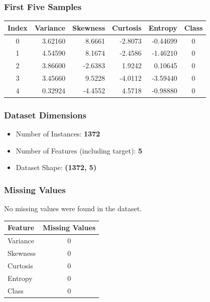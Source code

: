 \documentclass[11pt]{article}
\begin{document}
\subsubsection*{First Five Samples}

\begin{center}
\small
\begin{tabular}{|c|r|r|r|r|c|}
\hline
\textbf{Index} & \textbf{Variance} & \textbf{Skewness} & \textbf{Curtosis} & \textbf{Entropy} & \textbf{Class}\\
\hline
0 & 3.62160 & 8.6661 & -2.8073 & -0.44699 & 0\\
1 & 4.54590 & 8.1674 & -2.4586 & -1.46210 & 0\\
2 & 3.86600 & -2.6383 & 1.9242 & 0.10645 & 0\\
3 & 3.45660 & 9.5228 & -4.0112 & -3.59440 & 0\\
4 & 0.32924 & -4.4552 & 4.5718 & -0.98880 & 0\\
\hline
\end{tabular}
\end{center}

\subsubsection*{Dataset Dimensions}

\begin{itemize}
    \item Number of Instances: \textbf{1372}
    \item Number of Features (including target): \textbf{5}
    \item Dataset Shape: \textbf{(1372, 5)}
\end{itemize}

\subsubsection*{Missing Values}

No missing values were found in the dataset.

\begin{center}
\begin{tabular}{|l|c|}
\hline
\textbf{Feature} & \textbf{Missing Values}\\
\hline
Variance & 0\\
Skewness & 0\\
Curtosis & 0\\
Entropy & 0\\
Class & 0\\
\hline
\end{tabular}
\end{center}
\end{document}
